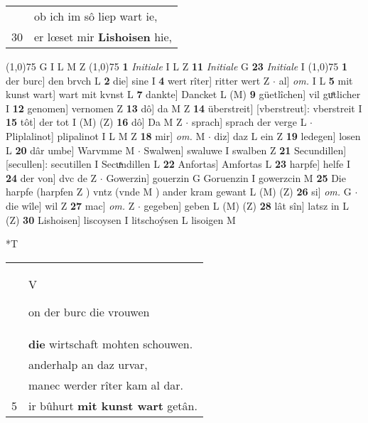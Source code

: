 \documentclass[8pt,a4paper,notitlepage]{article}
\begin{document}
\begin{table}[ht]
\begin{minipage}[t]{0.5\linewidth}
\begin{tabular}{rl}
 & ob ich im sô liep wart ie,\\ 
30 & er lœset mir \textbf{Lishoisen} hie,\\ 
\end{tabular}
\scriptsize
\line(1,0){75} \newline
G I L M Z \newline
\line(1,0){75} \newline
\textbf{1} \textit{Initiale} I L Z  \textbf{11} \textit{Initiale} G  \textbf{23} \textit{Initiale} I  \newline
\line(1,0){75} \newline
\textbf{1} der burc] den brvch L \textbf{2} die] sine I \textbf{4} wert rîter] ritter wert Z  $\cdot$ al] \textit{om.} I L \textbf{5} mit kunst wart] wart mit kvnst L \textbf{7} dankte] Dancket L (M) \textbf{9} güetlîchen] vil guͤtlicher I \textbf{12} genomen] vernomen Z \textbf{13} dô] da M Z \textbf{14} überstreit] [vberstreut]: vberstreit I \textbf{15} tôt] der tot I (M) (Z) \textbf{16} dô] Da M Z  $\cdot$ sprach] sprach der verge L  $\cdot$ Pliplalinot] plipalinot I L M Z \textbf{18} mir] \textit{om.} M  $\cdot$ diz] daz L ein Z \textbf{19} ledegen] losen L \textbf{20} dâr umbe] Warvmme M  $\cdot$ Swalwen] swaluwe I swalben Z \textbf{21} Secundillen] [secullen]: secutillen I Secuͯndillen L \textbf{22} Anfortas] Amfortas L \textbf{23} harpfe] helfe I \textbf{24} der von] dvc de Z  $\cdot$ Gowerzin] gouerzin G Goruenzin I gowerzcin M \textbf{25} Die harpfe (harpfen Z ) vntz (vnde M ) ander kram gewant L (M) (Z) \textbf{26} si] \textit{om.} G  $\cdot$ die wîle] wil Z \textbf{27} mac] \textit{om.} Z  $\cdot$ gegeben] geben L (M) (Z) \textbf{28} lât sîn] latsz in L (Z) \textbf{30} Lishoisen] liscoysen I litschoýsen L lisoigen M \newline
\end{minipage}
\hspace{0.5cm}
\begin{minipage}[t]{0.5\linewidth}
\small
\begin{center}*T
\end{center}
\begin{tabular}{rl}
 & \begin{large}V\end{large}on der burc die vrouwen\\ 
 & \textbf{die} wirtschaft mohten schouwen.\\ 
 & anderhalp an daz urvar,\\ 
 & manec werder rîter kam al dar.\\ 
5 & ir bûhurt \textbf{mit kunst wart} getân.\\ 

\end{tabular}
\end{minipage}
\end{table}
\end{document}
